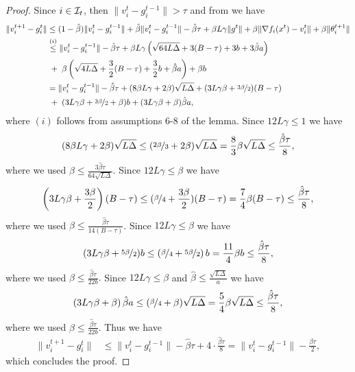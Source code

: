 \documentclass[a4paper,11pt]{article}
\begin{document}
\begin{proof}
Since $i\in\mathcal{I}_t$, then $\|v_i^t-g_i^{t-1}\| > \tau$ and from  we have 
\begin{align*}
    \|v_i^{t+1} - g_i^t\| &\le 
    (1-\hat{\beta})\|v_i^t  - g_i^{t-1}\| 
    + \hat{\beta}\|v_i^t - g_i^{t-1}\| - \hat{\beta}\tau 
    + \beta L\gamma\|g^t\| 
    + \beta\|\nabla f_i(x^t) - v_i^t\|
    + \beta\|\theta^{t+1}_i\|\\
    &\overset{(i)}{\le}  \|v_i^t  - g_i^{t-1}\| - \hat{\beta}\tau 
    + \beta L\gamma\left(\sqrt{64L\Delta} + 3(B-\tau) + 3b + 3\hat{\beta}a\right)\\
    & \;+\; \beta\left(\sqrt{4L\Delta} + \frac{3}{2}(B-\tau) + \frac{3}{2}b + \hat{\beta}a\right)
    + \beta b\\
    &= \|v_i^t  - g_i^{t-1}\| - \hat{\beta}\tau
    + (8\beta L\gamma + 2\beta)\sqrt{L\Delta}
    + (3L\gamma\beta + \nicefrac{3\beta}{2})(B-\tau)\\
    &\;+\; 
    (3L\gamma\beta + \nicefrac{3\beta}{2} + \beta)b
    + (3L\gamma\beta + \beta)\hat{\beta}a,
\end{align*}
where $(i)$ follows from assumptions $6$-$8$ of the lemma. 
Since $12L\gamma \le 1$ we have 
\[
(8\beta L\gamma + 2\beta)\sqrt{L\Delta} \le (\nicefrac{2\beta}{3} + 2\beta)\sqrt{L\Delta} = \frac{8}{3}\beta\sqrt{L\Delta} \le \frac{\hat{\beta}\tau}{8},
\]
where we used $\beta \le \frac{3\hat{\beta}\tau}{64\sqrt{L\Delta}}.$
Since $12L\gamma \le \beta$ we have 
\[
\left(3L\gamma\beta + \frac{3\beta}{2}\right)(B-\tau) \le (\nicefrac{\beta}{4} + \frac{3\beta}{2})(B-\tau) = \frac{7}{4}\beta(B-\tau) \le \frac{\hat{\beta}\tau}{8},
\]
where we used $\beta \le \frac{\hat{\beta}\tau}{14(B-\tau)}$.
Since $12L\gamma\le \beta$ we have
\[
(3L\gamma\beta + \nicefrac{5\beta}{2})b \le \left(\nicefrac{\beta}{4} + \nicefrac{5\beta}{2}\right)b = \frac{11}{4}\beta b \le \frac{\hat{\beta}\tau}{8},
\]
where we used $\beta \le \frac{\hat{\beta}\tau}{22b}.$ Since $12L\gamma \le \beta$ and $\hat{\beta} \le \frac{\sqrt{L\Delta}}{a}$ we have
\[
\left(3L\gamma\beta +
\beta\right)\hat{\beta} a \le (\nicefrac{\beta}{4} + \beta)\sqrt{L\Delta} = \frac{5}{4}\beta\sqrt{L\Delta} \le \frac{\hat{\beta}\tau}{8},
\]
where we used $\beta \le \frac{\hat{\beta}\tau}{22b}.$ Thus we have
\begin{align*}
    \|v_i^{t+1} - g_i^t\| &\le \|v_i^t  - g_i^{t-1}\| 
    - \hat{\beta}\tau
    + 4\cdot \frac{\hat{\beta}\tau}{8} = \|v_i^t  - g_i^{t-1}\| 
    - \frac{\hat{\beta}\tau}{2}, 
\end{align*}
which concludes the proof.
\end{proof}
\end{document}
